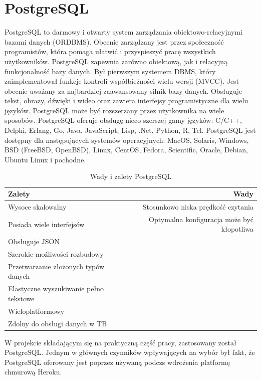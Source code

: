 \documentclass[oneside,polski,logo,indent]{amuthesis}
\begin{document}
\section{PostgreSQL}
PostgreSQL to darmowy i otwarty system zarządzania obiektowo-relacyjnymi bazami danych (ORDBMS). Obecnie zarządzany jest przez społeczność programistów, która pomaga ułatwić i przyspieszyć  pracę wszystkich użytkowników.
PostgreSQL zapewnia zarówno obiektową, jak i relacyjną funkcjonalność bazy danych. Był pierwszym systemem DBMS, który zaimplementował funkcje kontroli współbieżności wielu wersji (MVCC). Jest obecnie uważany za najbardziej zaawansowany silnik bazy danych. Obsługuje tekst, obrazy, dźwięki i wideo oraz zawiera interfejsy programistyczne dla wielu języków. PostgreSQL może być rozszerzany przez użytkownika na wiele sposobów.
PostgreSQL oferuje obsługę nieco szerszej gamy języków: C/C++, Delphi, Erlang, Go, Java, JavaScript, Lisp, .Net, Python, R, Tcl.
PostgreSQL jest dostępny dla następujących systemów operacyjnych: MacOS, Solaris, Windows, BSD (FreeBSD, OpenBSD), Linux, CentOS, Fedora, Scientific, Oracle, Debian, Ubuntu Linux i pochodne.


\begin{table}[H]
\caption{Wady i zalety PostgreSQL}
\label{tabela-PostgreSQL}
\centering
\begin{adjustbox}{width=1\textwidth}
\small
\begin{tabular}{lr}
\toprule
Zalety & Wady\\
\midrule
Wysoce skalowalny & Stosunkowo niska prędkość czytania\\ 
Posiada wiele interfejsów & Optymalna konfiguracja może być kłopotliwa\\ 
Obsługuje JSON &  \\ 
Szerokie możliwości rozbudowy &  \\ 
Przetwarzanie złożonych typów danych &  \\ 
Elastyczne wyszukiwanie pełno tekstowe  &  \\ 
Wieloplatformowy &  \\ 
Zdolny do obsługi danych w TB &  \\ 
\bottomrule
\end{tabular}
\end{adjustbox}
\end{table}
  

W projekcie składającym się na praktyczną część pracy, zastosowany został PostgreSQL. Jednym w głównych czynników wpływających na wybór był fakt, że PostgreSQL oferowany jest poprzez używaną podczs wdrożenia platformę chmurową Heroku. 
\end{document}
